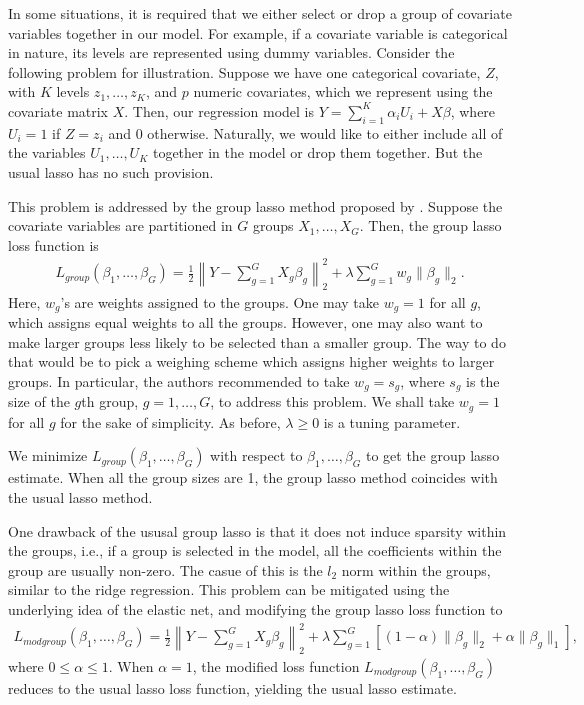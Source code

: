 \documentclass[
]{book}
\begin{document}
In some situations, it is required that we either select or drop a group of covariate variables together in our model. For example, if a covariate variable is categorical in nature, its levels are represented using dummy variables. Consider the following problem for illustration. Suppose we have one categorical covariate, \(Z\), with \(K\) levels \(z_1, \ldots, z_K\), and \(p\) numeric covariates, which we represent using the covariate matrix \(X\). Then, our regression model is \(Y = \sum_{i=1}^K \alpha_i U_i + X \beta\), where \(U_i = 1\) if \(Z = z_i\) and \(0\) otherwise. Naturally, we would like to either include all of the variables \(U_1, \ldots, U_K\) together in the model or drop them together. But the usual lasso has no such provision.

This problem is addressed by the group lasso method proposed by \citet{yuan2006model}. Suppose the covariate variables are partitioned in \(G\) groups \(X_1, \ldots, X_G\). Then, the group lasso loss function is
\begin{align*}
L_{group}(\beta_1, \ldots, \beta_G) = \frac{1}{2} \left\| Y - \sum_{g=1}^G X_g \beta_g \right\|^2_2 + \lambda \sum_{g=1}^G w_g \| \beta_g \|_2 .
\end{align*}
Here, \(w_g\)'s are weights assigned to the groups. One may take \(w_g = 1\) for all \(g\), which assigns equal weights to all the groups. However, one may also want to make larger groups less likely to be selected than a smaller group. The way to do that would be to pick a weighing scheme which assigns higher weights to larger groups. In particular, the authors \citet{yuan2006model} recommended to take \(w_g = s_g\), where \(s_g\) is the size of the \(g\)th group, \(g = 1, \ldots, G\), to address this problem. We shall take \(w_g = 1\) for all \(g\) for the sake of simplicity. As before, \(\lambda \ge 0\) is a tuning parameter.

We minimize \(L_{group}(\beta_1, \ldots, \beta_G)\) with respect to \(\beta_1, \ldots, \beta_G\) to get the group lasso estimate. When all the group sizes are 1, the group lasso method coincides with the usual lasso method.

One drawback of the ususal group lasso is that it does not induce sparsity within the groups, i.e., if a group is selected in the model, all the coefficients within the group are usually non-zero. The casue of this is the \(l_2\) norm within the groups, similar to the ridge regression. This problem can be mitigated using the underlying idea of the elastic net, and modifying the group lasso loss function to
\begin{align*}
L_{modgroup}(\beta_1, \ldots, \beta_G) = \frac{1}{2} \left\| Y - \sum_{g=1}^G X_g \beta_g \right\|^2_2 + \lambda \sum_{g=1}^G [ (1 - \alpha) \| \beta_g \|_2 + \alpha \| \beta_g \|_1 ] ,
\end{align*}
where \(0 \le \alpha \le 1\). When \(\alpha = 1\), the modified loss function \(L_{modgroup}(\beta_1, \ldots, \beta_G)\) reduces to the usual lasso loss function, yielding the usual lasso estimate.
\end{document}
